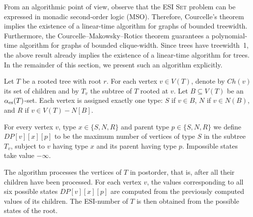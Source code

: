 \documentclass[11pt]{article}
\newcommand{\es}{\alpha_{\rm es}}
\newcommand{\ip}[1]{{\color{blue}#1}}%
\newcommand{\rr}[1]{{\color{green!70!black}#1}}%
\newcommand{\db}[1]{{\color{orange}#1}}%
\begin{document}
From an algorithmic point of view, observe that the \textsc{ESI Set} problem can be expressed in monadic second-order logic (MSO). Therefore, Courcelle's theorem \cite{Cour} implies the existence of a linear-time algorithm for graphs of bounded treewidth. Furthermore, the Courcelle--Makowsky--Rotics theorem \cite{CoMR} guarantees a polynomial-time algorithm for graphs of bounded clique-width. Since trees have treewidth~1, the above result already implies the existence of a linear-time algorithm for trees. In the remainder of this section, we present such an algorithm explicitly.

Let $T$ be a rooted tree with root $r$.
For each vertex $v\in V(T)$, denote by $Ch(v)$ its set of children and by $T_v$ the subtree of $T$ rooted at $v$.
Let $B\subseteq V(T)$ be an $\es(T)$-set.
Each vertex is assigned exactly one type: $S$ if $v\in B$, $N$ if $v\in N(B)$, and $R$ if $v\in V(T)-N[B]$. %

For every vertex $v$, type $x\in\{S,N,R\}$ and parent type
$p\in\{S,N,R\}$ we define $DP[v][x][p]$
to be the maximum number of vertices of type $S$ in the subtree $T_v$, subject to $v$ having type $x$ and its parent having type $p$. Impossible states take value $-\infty$.

The algorithm processes the vertices of $T$ in postorder, that is, after all their children have been processed.
For each vertex $v$, the values corresponding to all six possible states $DP[v][x][p]$ are computed from the previously computed values of its children. The ESI-number of $T$ is then obtained from the possible states of the root.

\end{document}
